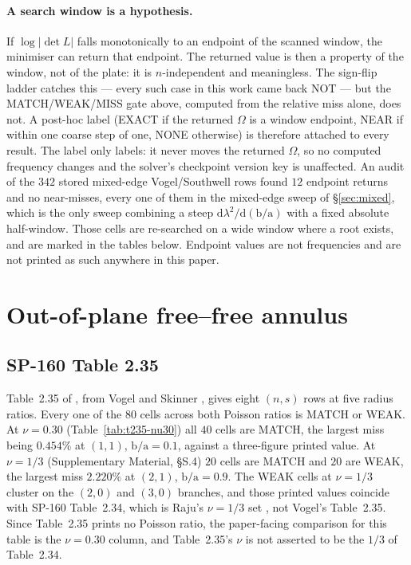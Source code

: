 \documentclass[11pt]{article}
\newcommand{\lamsq}{\lambda^{2}}
\newcommand{\ba}{\mbox{b/a}}
\begin{document}
\paragraph{A search window is a hypothesis.}
If $\log|\det L|$ falls monotonically to an endpoint of the scanned window,
the minimiser can return that endpoint. The returned value is then a property
of the window, not of the plate: it is $n$-independent and meaningless. The
sign-flip ladder catches this --- every such case in this work came back NOT
--- but the MATCH/WEAK/MISS gate above, computed from the relative miss alone,
does not. A post-hoc label (EXACT if the returned $\Omega$ is a window
endpoint, NEAR if within one coarse step of one, NONE otherwise) is therefore
attached to every result. The label only labels: it never moves the returned
$\Omega$, so no computed frequency changes and the solver's checkpoint version
key is unaffected. An audit of the $342$ stored mixed-edge Vogel/Southwell
rows found $12$ endpoint returns and no near-misses, every one of them in
the mixed-edge sweep
of \S\ref{sec:mixed}, which is the only sweep combining a steep
$\mathrm{d}\lamsq/\mathrm{d}(\ba)$ with a fixed absolute half-window. Those
cells are re-searched on a wide window where a root exists, and are marked in
the tables below. Endpoint values are not frequencies and are not printed as
such anywhere in this paper.

\section{Out-of-plane free--free annulus}\label{sec:ff-annulus}

\subsection{SP-160 Table 2.35}\label{sec:t235}
Table~2.35 of \cite{leissaSP160}, from Vogel and Skinner \cite{vogelSkinner},
gives eight $(n,s)$ rows at five radius ratios. Every one of the $80$ cells
across both Poisson ratios is MATCH or WEAK. At $\nu=0.30$
(Table~\ref{tab:t235-nu30}) all $40$ cells are MATCH, the largest miss being
$0.454\%$ at $(1,1)$, $\ba=0.1$, against a three-figure printed value. At
$\nu=1/3$ (Supplementary Material, \S{}S.4) $20$ cells are MATCH and $20$ are
WEAK, the largest miss $2.220\%$ at $(2,1)$, $\ba=0.9$. The WEAK cells at
$\nu=1/3$ cluster on the $(2,0)$ and $(3,0)$ branches, and those printed
values coincide with SP-160 Table~2.34, which is Raju's $\nu=1/3$ set
\cite{raju}, not Vogel's Table~2.35. Since Table~2.35 prints no Poisson ratio,
the paper-facing comparison for this table is the $\nu=0.30$ column, and
Table~2.35's $\nu$ is not asserted to be the $1/3$ of Table~2.34.
\end{document}
